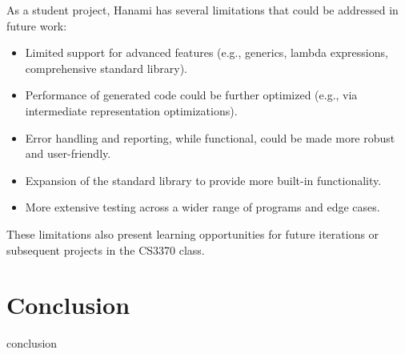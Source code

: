 \documentclass[conference]{IEEEtran}
\begin{document}
As a student project, Hanami has several limitations that could be addressed in future work:

\begin{itemize}
    \item Limited support for advanced features (e.g., generics, lambda expressions, comprehensive standard library).
    \item Performance of generated code could be further optimized (e.g., via intermediate representation optimizations).
    \item Error handling and reporting, while functional, could be made more robust and user-friendly.
    \item Expansion of the standard library to provide more built-in functionality.
    \item More extensive testing across a wider range of programs and edge cases.
\end{itemize}

These limitations also present learning opportunities for future iterations or subsequent projects in the CS3370 class.

\section{Conclusion} %
\label{sec:conclusion}
conclusion


\end{document}
